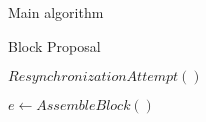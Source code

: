 \documentclass[10pt,a4paper]{article}
\begin{document}
\begin{section}{Main algorithm}

\begin{subsection}{Block Proposal}\label{ssect:blockproposal}

    \begin{algorithm}
        \begin{algorithmic}[1]

            \State $ResynchronizationAttempt()$

            \State $e \gets AssembleBlock()$


\end{algorithmic}
\end{algorithm}
\end{subsection}
\end{section}
\end{document}
